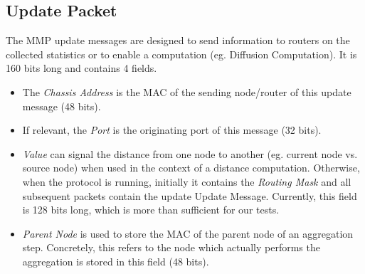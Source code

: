 

% 

\subsection{Update Packet}

The MMP update messages are designed to send information to routers on the
collected statistics or to enable a computation (eg. Diffusion Computation). It
is 160 bits long and contains 4 fields.


\begin{itemize}
 \item The \textit{Chassis Address} is the MAC of the sending node/router of this update message (48 bits). 
 \item If relevant, the \textit{Port} is the originating port of this message (32 bits).
 \item \textit{Value} can signal the distance from one node to another (eg.
current node vs. source node) when used in the context of a distance computation. Otherwise, when the protocol is running, initially it contains the \textit{Routing Mask} and all subsequent packets contain the update Update Message. Currently, this field is 128 bits long, which is more than sufficient for our tests. 
 \item \textit{Parent Node} is used to store the MAC of the parent node of an aggregation
step. Concretely, this refers to the node which actually performs the
aggregation is stored in this field (48 bits).
\end{itemize}


